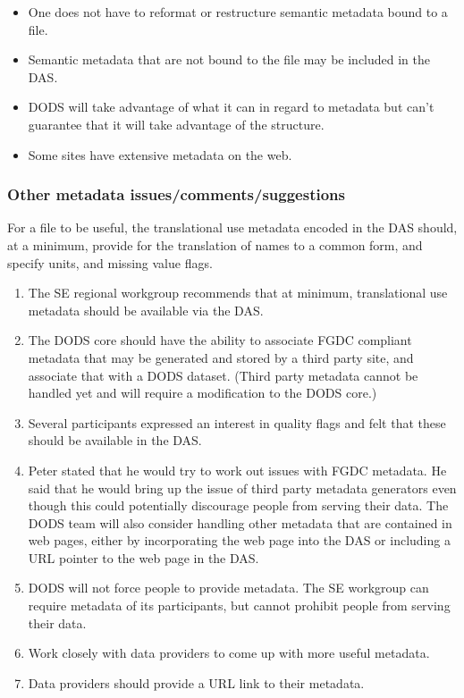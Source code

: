 \begin{itemize}
\item One does not have to reformat or restructure semantic metadata
  bound to a file.
\item Semantic metadata that are not bound to the file may be included
  in the DAS.
\item DODS will take advantage of what it can in regard to metadata
  but can't guarantee that it will take advantage of the structure.
\item Some sites have extensive metadata on the web.
\end{itemize}

\subsubsection{Other metadata issues/comments/suggestions}

For a file to be useful, the translational use metadata encoded in the
DAS should, at a minimum, provide for the translation of names to a
common form, and specify units, and missing value flags.

\begin{enumerate}
\item The SE regional workgroup recommends that at minimum,
  translational use metadata should be available via the DAS.
\item The DODS core should have the ability to associate FGDC
  compliant metadata that may be generated and stored by a third party
  site, and associate that with a DODS dataset. (Third party metadata
  cannot be handled yet and will require a modification to the DODS
  core.)
\item Several participants expressed an interest in quality flags and
  felt that these should be available in the DAS.
\item Peter stated that he would try to work out issues with FGDC
  metadata.  He said that he would bring up the issue of third party
  metadata generators even though this could potentially discourage
  people from serving their data.  The DODS team will also consider
  handling other metadata that are contained in web pages, either by
  incorporating the web page into the DAS or including a URL pointer
  to the web page in the DAS.
\item DODS will not force people to provide metadata.  The SE
  workgroup can require metadata of its participants, but cannot
  prohibit people from serving their data.
\item Work closely with data providers to come up with more useful
  metadata.
\item Data providers should provide a URL link to their metadata.
\end{enumerate}


